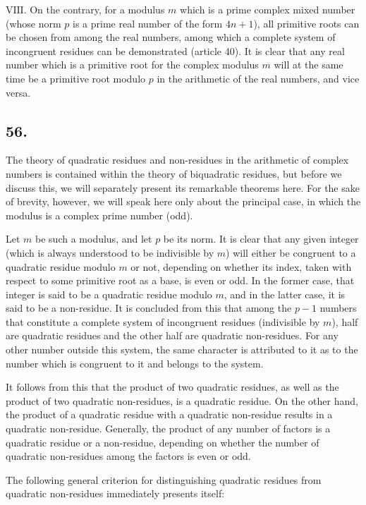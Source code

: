 \documentclass[twoside,12pt]{memoir}
\begin{document}
\(\text{VIII.}\) On the contrary, for a modulus \(m\) which is a prime complex mixed number (whose norm \(p\) is a prime real number of the form \(4 n+1\)), all primitive roots can be chosen from among the real numbers, among which a complete system of incongruent residues can be demonstrated (article 40).  It is clear that any real number which is a primitive root for the complex modulus \(m\) will at the same time be a primitive root modulo \(p\) in the arithmetic of the real numbers, and vice versa.

\subsection*{56.}
 
The theory of quadratic residues and non-residues in the arithmetic of complex numbers is contained within the theory of biquadratic residues, but before we discuss this, we will separately present its remarkable theorems here. For the sake of brevity, however, we will speak here only about the principal case, in which the modulus is a complex prime number (odd).

Let \(m\) be such a modulus, and let \(p\) be its norm. It is clear that any given integer (which is always understood to be indivisible by \(m\)) will either be congruent to a quadratic residue modulo \(m\) or not, depending on whether its index, taken with respect to some primitive root as a base, is even or odd. In the former case, that integer is said to be a quadratic residue modulo \(m\), and in the latter case, it is said to be a non-residue. It is concluded from this that among the \(p-1\) numbers that constitute a complete system of incongruent residues (indivisible by \(m\)), half are quadratic residues and the other half are quadratic non-residues. For any other number outside this system, the same \pagebreak%
character is attributed to it as to the number which is congruent to it and belongs to the system.

It follows from this that the product of two quadratic residues, as well as the product of two quadratic non-residues, is a quadratic residue. On the other hand, the product of a quadratic residue with a quadratic non-residue results in a quadratic non-residue. Generally, the product of any number of factors is a quadratic residue or a non-residue, depending on whether the number of quadratic non-residues among the factors is even or odd.

The following general criterion for distinguishing quadratic residues from quadratic non-residues immediately presents itself:
 
\end{document}
